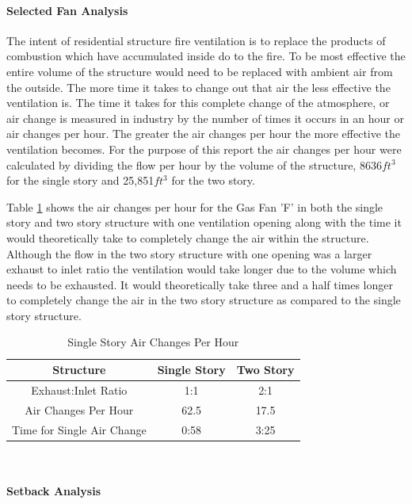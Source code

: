 \documentclass{article}
\begin{document}
\paragraph{Selected Fan Analysis} \mbox{}

The intent of residential structure fire ventilation is to replace the products of combustion which have accumulated inside do to the fire. To be most effective the entire volume of the structure would need to be replaced with ambient air from the outside. The more time it takes to change out that air the less effective the ventilation is. The time it takes for this complete change of the atmosphere, or air change is measured in industry by the number of times it occurs in an hour or air changes per hour. The greater the air changes per hour the more effective the ventilation becomes. For the purpose of this report the air changes per hour were calculated by dividing the flow per hour by the volume of the structure,  8636$ft^3$ for the single story and 25,851$ft^3$ for the two story. 

Table \ref{table:airchanges} shows the air changes per hour for the Gas Fan 'F' in both the single story and two story structure with one ventilation opening along with the time it would theoretically take to completely change the air within the structure. Although the flow in the two story structure with one opening was a larger exhaust to inlet ratio the ventilation would take longer due to the volume which needs to be exhausted. It would theoretically take three and a half times longer to completely change the air in the two story structure as compared to the single story structure. 

\begin{table}[H]
	\centering
	\caption{Single Story Air Changes Per Hour}
	\begin{tabular}{|c|c|c|}
		\hline
		Structure & Single Story & Two  Story \\ \hline \hline
		Exhaust:Inlet Ratio & 1:1 & 2:1 \\ \hline \hline
		Air Changes Per Hour & 62.5 & 17.5 \\ \hline
		Time for Single Air Change & 0:58 & 3:25  \\ \hline
	\end{tabular}
	\label{table:airchanges}
\end{table}\

\paragraph{Setback Analysis} \mbox{}
\end{document}
